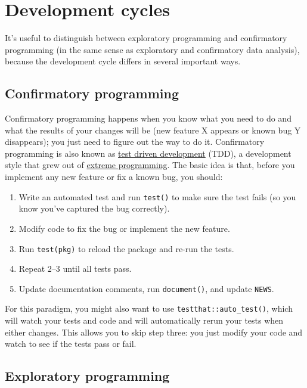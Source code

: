 \section{Development cycles}

It's useful to distinguish between exploratory programming and
confirmatory programming (in the same sense as exploratory and
confirmatory data analysis), because the development cycle differs in
several important ways.

\subsection{Confirmatory programming}

Confirmatory programming happens when you know what you need to do and
what the results of your changes will be (new feature X appears or known
bug Y disappears); you just need to figure out the way to do it.
Confirmatory programming is also known as
\href{http://en.wikipedia.org/wiki/Test-driven_development}{test driven
development} (TDD), a development style that grew out of
\href{extreme-programming}{extreme programming}. The basic idea is that,
before you implement any new feature or fix a known bug, you should:

\begin{enumerate}
\def\labelenumi{\arabic{enumi}.}
\item
  Write an automated test and run \texttt{test()} to make sure the test
  fails (so you know you've captured the bug correctly).
\item
  Modify code to fix the bug or implement the new feature.
\item
  Run \texttt{test(pkg)} to reload the package and re-run the tests.
\item
  Repeat 2--3 until all tests pass.
\item
  Update documentation comments, run \texttt{document()}, and update
  \texttt{NEWS}.
\end{enumerate}

For this paradigm, you might also want to use
\texttt{testthat::auto\_test()}, which will watch your tests and code
and will automatically rerun your tests when either changes. This allows
you to skip step three: you just modify your code and watch to see if
the tests pass or fail.

\subsection{Exploratory programming}

